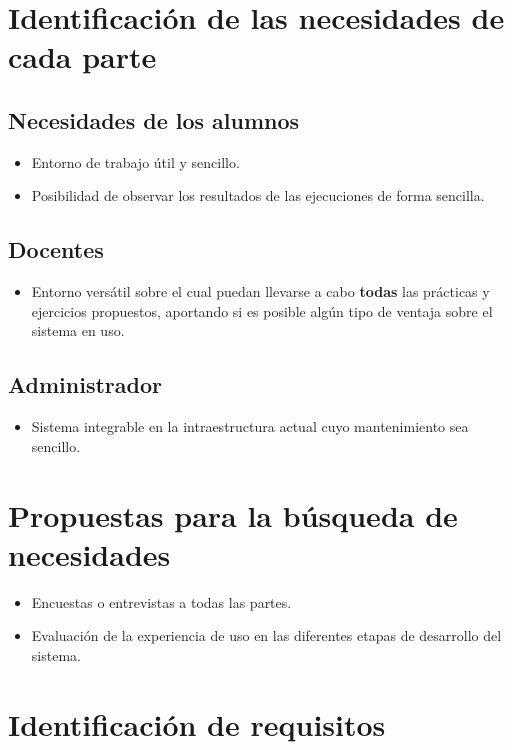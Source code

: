 \section{Identificación de las necesidades de cada parte}
\subsection{Necesidades de los alumnos}

\begin{itemize}
  \item Entorno de trabajo útil y sencillo.
  \item Posibilidad de observar los resultados de las ejecuciones de forma sencilla.
\end{itemize}

\subsection{Docentes}

\begin{itemize}
  \item Entorno versátil sobre el cual puedan llevarse a cabo \textbf{todas} las prácticas y ejercicios propuestos, aportando si es posible algún tipo de ventaja sobre el sistema en uso.
\end{itemize}
\subsection{Administrador}
\begin{itemize}
  \item Sistema integrable en la intraestructura actual cuyo mantenimiento sea sencillo.
\end{itemize}

\section{Propuestas para la búsqueda de necesidades}

\begin{itemize}
  \item Encuestas o entrevistas a todas las partes.
  \item Evaluación de la experiencia de uso en las diferentes etapas de desarrollo del sistema.
\end{itemize}

\section{Identificación de requisitos}

